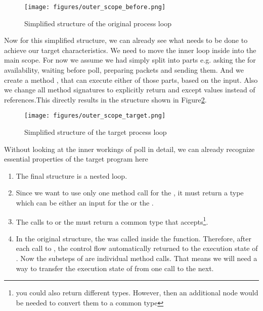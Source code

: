 \begin{figure}[H]
    \centering
    \texttt{[image: figures/outer\_scope\_before.png]}
    \caption{Simplified structure of the original process loop}
    \label{fig:mainLoopOriginal}
\end{figure}

Now for this simplified structure, we can already see what needs to be done to achieve our target characteristics. We need to move the inner loop inside  into the main scope.
For now we assume we had simply split  into parts e.g. asking the  for availability, waiting before poll, preparing packets and sending them. And we create a method , that can execute either of those parts, based on the input.
Also we change all method signatures to explicitly return and except values instead of references.This directly results in the structure shown in Figure\ref{fig:mainLoopTarget}. 

\begin{figure}[H]
    \centering
    \texttt{[image: figures/outer\_scope\_target.png]}
    \caption{Simplified structure of the target process loop}
    \label{fig:mainLoopTarget}
\end{figure}

Without looking at the inner workings of poll in detail, we can already recognize essential properties of the target program here

\begin{enumerate}
    \item The final structure is a nested loop.
    \item Since we want to use only one method call for the , it must return a type which can be either an input for the  or the .
    \item The calls to  or the  must return a common type that  accepts\footnote{you could also return different types. However, then an additional node would be needed to convert them to a common type}.
    \item In the original structure, the  was called inside the  function. Therefore, after each call to , the control flow automatically returned to the execution state of . Now the substeps of  are individual method calls. That means we will need a way to transfer the execution state of  from one call to the next. 
\end{enumerate}

